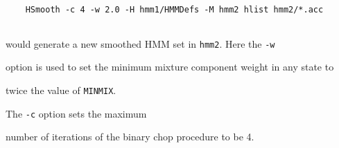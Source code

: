 \begin{verbatim}


    HSmooth -c 4 -w 2.0 -H hmm1/HMMDefs -M hmm2 hlist hmm2/*.acc


\end{verbatim}


would generate a new smoothed HMM set in \texttt{hmm2}.  Here the \texttt{-w}


option is used to set the minimum mixture component weight in any state to


twice the value of \texttt{MINMIX}.  


The \texttt{-c} option sets the maximum


number of iterations of the binary chop procedure to be 4.



















